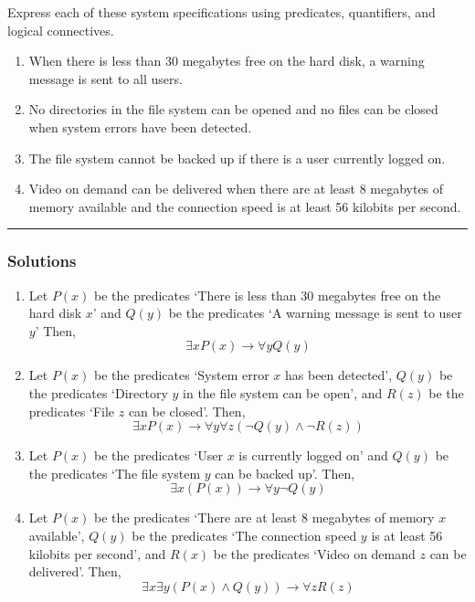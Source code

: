 \newpage
\begin{question}
Express each of these system specifications using predicates, quantifiers, and logical connectives.
\begin{enumerate}
\item When there is less than 30 megabytes free on the hard disk, a warning message is sent to all users.
\item No directories in the file system can be opened and no files can be closed when system errors have been detected.
\item The file system cannot be backed up if there is a user currently logged on.
\item Video on demand can be delivered when there are at least 8 megabytes of memory available and the connection speed is at least 56 kilobits per second.
\end{enumerate}
\end{question}

\par\noindent\rule{\textwidth}{0.5pt}

\subsubsection*{Solutions}
\begin{enumerate}
    \item Let $P(x)$ be the predicates `There is less than 30 megabytes free on the hard disk $x$' and $Q(y)$ be the predicates `A warning message is sent to user $y$' Then, $$\exists x P(x) \rightarrow \forall y Q(y)$$
    \item Let $P(x)$ be the predicates `System error $x$ has been detected', $Q(y)$ be the predicates `Directory $y$ in the file system can be open', and $R(z)$ be the predicates `File $z$ can be closed'. Then, $$\exists x P(x) \rightarrow \forall y \forall z(\neg Q(y) \wedge \neg R(z))$$
    \item Let $P(x)$ be the predicates `User $x$ is currently logged on' and $Q(y)$ be the predicates `The file system $y$ can be backed up'. Then, $$ \exists x (P(x)) \rightarrow \forall y \neg Q(y)$$
    \item Let $P(x)$ be the predicates `There are at least 8 megabytes of memory $x$ available', $Q(y)$ be the predicates `The connection speed $y$ is at least 56 kilobits per second', and $R(x)$ be the predicates `Video on demand $z$ can be delivered'. Then, $$\exists x \exists y( P(x) \wedge Q(y)) \rightarrow \forall z R(z)$$
\end{enumerate}
